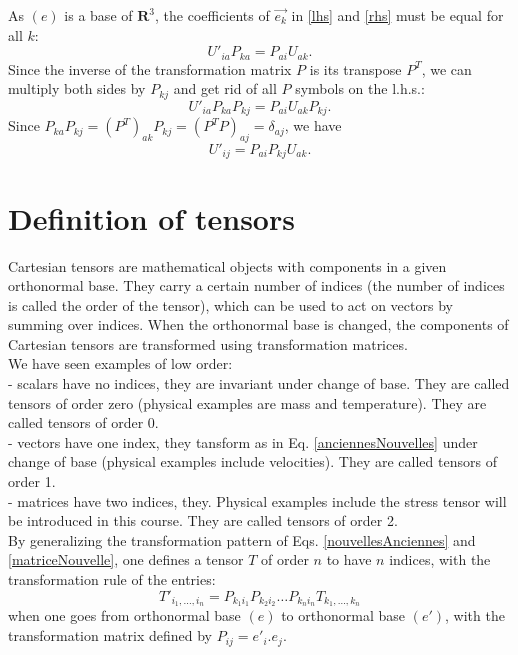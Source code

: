 \documentclass[DIV=12]{article}
\begin{document}
As $(e)$ is a base of $\mathbf{R}^3$, the coefficients of $\vec{e_k}$
 in \ref{lhs} and \ref{rhs} must be equal for all $k$:
\begin{equation}
U'_{ia}P_{ka} = P_{ai}U_{ak}.
\label{trans1}
\end{equation}
Since the inverse of the transformation matrix $P$ is its transpose $P^T$,
 we can multiply both sides by $P_{kj}$ and get rid of all $P$ symbols on the 
 l.h.s.:
\begin{equation}
 U'_{ia}P_{ka}P_{kj} = P_{ai}U_{ak} P_{kj}.
\end{equation}
Since $P_{ka}P_{kj} =(P^T)_{ak}P_{kj}  = (P^TP)_{aj} = \delta_{aj}$, we
have
\begin{equation}
 \boxed{U'_{ij} = P_{ai}P_{kj}U_{ak}.}
\label{matriceNouvelle}
\end{equation}


  
\section{Definition of tensors}
 Cartesian tensors are mathematical objects with components in a given orthonormal base.
  They carry a certain number of indices (the number of indices is called the order of the tensor), 
 which can be used to act on vectors by summing over indices. When the orthonormal base is changed, the components 
 of Cartesian tensors are transformed using transformation matrices.\\


We have seen examples of low order:\\
- scalars have no indices, they are invariant under change of base. They are called tensors of order zero (physical examples
 are mass and temperature). They are called tensors of order 0.\\
- vectors have one index, they tansform as in Eq. \ref{anciennesNouvelles} under change of base (physical examples include
 velocities). They are called tensors of order 1.\\
- matrices have two indices, they. Physical examples include the stress tensor will be introduced in this course. They are called 
 tensors of order 2.\\
By generalizing the transformation pattern of Eqs. \ref{nouvellesAnciennes} and \ref{matriceNouvelle},
 one defines a tensor $T$ of order $n$ to have $n$ indices, with the transformation rule of the entries:
\begin{equation}
 \boxed{T'_{i_1,\dots,i_n} = P_{k_1i_1}P_{k_2 i_2}\dots P_{k_n i_n} T_{k_1,\dots,k_n}}
\end{equation}
when one goes from orthonormal base $(e)$ to orthonormal base $(e')$, with the
transformation matrix defined by $P_{ij} = e'_i.e_j$.\\
\vspace{3mm}
\end{document}
